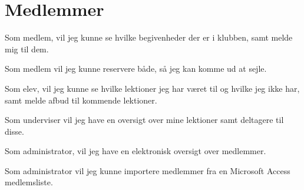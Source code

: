 \section*{Medlemmer}
Som medlem, vil jeg kunne se hvilke begivenheder der er i klubben, samt melde mig til dem.

Som medlem vil jeg kunne reservere både, så jeg kan komme ud at sejle.

Som elev, vil jeg kunne se hvilke lektioner jeg har været til og hvilke jeg ikke har, samt melde afbud til kommende lektioner.

Som underviser vil jeg have en oversigt over mine lektioner samt deltagere til disse.

Som administrator, vil jeg have en elektronisk oversigt over medlemmer.

Som administrator vil jeg kunne importere medlemmer fra en Microsoft Access medlemsliste.

